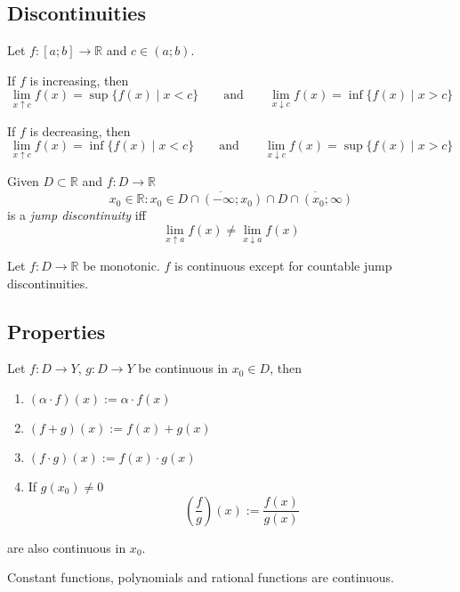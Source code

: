 \subsection{Discontinuities}
\begin{proposition}\label{pro:one_sided_lim_incr}
   Let \(f: [a; b] \to \mathbb{R}\) and \(c \in (a; b)\).

   If \(f\) is increasing, then
   \[\lim_{x \uparrow c} f(x) = \sup\{f(x) \mid x < c\} \qquad\text{and}\qquad \lim_{x \downarrow c} f(x) = \inf\{f(x) \mid x > c\}\]

   If \(f\) is decreasing, then
   \[\lim_{x \uparrow c} f(x) = \inf\{f(x) \mid x < c\} \qquad\text{and}\qquad \lim_{x \downarrow c} f(x) = \sup\{f(x) \mid x > c\}\]
\end{proposition}

\begin{definition}
   Given \(D \subset \mathbb{R}\) and \(f: D \to \mathbb{R}\)
   \[x_0 \in \mathbb{R}: x_0 \in \overline{D \cap (-\infty; x_0)} \cap \overline{D \cap (x_0; \infty)}\]
   is a \emph{jump discontinuity} iff
   \[\lim_{x \uparrow a} f(x) \neq \lim_{x \downarrow a} f(x)\]
\end{definition}

\begin{theorem}
   Let \(f:D \to \mathbb{R}\) be monotonic.
   \(f\) is continuous except for countable jump discontinuities.
\end{theorem}

\subsection{Properties}
\begin{proposition}
   Let \(f: D \to Y\), \(g: D \to Y\) be continuous in \(x_0 \in D\), then
   \begin{enumerate}[label=\roman*, align=Center]
      \item \((\alpha \cdot f)(x) := \alpha \cdot f(x)\)
      \item \((f + g)(x) := f(x) + g(x)\)
      \item \((f \cdot g)(x) := f(x) \cdot g(x)\)
      \item If \(g(x_0) \neq 0\)
         \[\left(\frac{f}{g}\right)(x) := \frac{f(x)}{g(x)}\]
   \end{enumerate}
   are also continuous in \(x_0\).
\end{proposition}

\begin{corollary}
   Constant functions, polynomials and rational functions are continuous.
\end{corollary}

